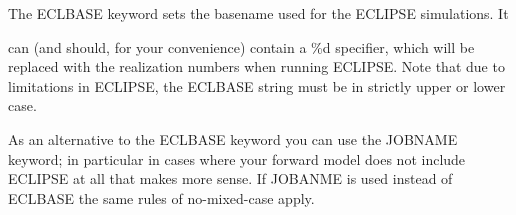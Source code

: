 \documentclass[letterpaper,10pt,english]{sphinxmanual}
\begin{document}
\begin{sphinxShadowBox}

\begin{DUlineblock}{0em}
\item[] The ECLBASE keyword sets the basename used for the ECLIPSE simulations. It
\end{DUlineblock}

can (and should, for your convenience) contain a \%d specifier, which will be
replaced with the realization numbers when running ECLIPSE. Note that due to
limitations in ECLIPSE, the ECLBASE string must be in strictly upper or lower
case.


%
\begin{sphinxVerbatim}[commandchars=\\\{\}]
     
        
     
 
 
 
 
   
 
\end{sphinxVerbatim}
\end{sphinxShadowBox}
\label{\detokenize{keywords/index:jobname}}
\begin{sphinxShadowBox}

As an alternative to the ECLBASE keyword you can use the JOBNAME keyword; in
particular in cases where your forward model does not include ECLIPSE at all
that makes more sense. If JOBANME is used instead of ECLBASE the same rules of
no-mixed-case apply.
\end{sphinxShadowBox}
\end{document}
